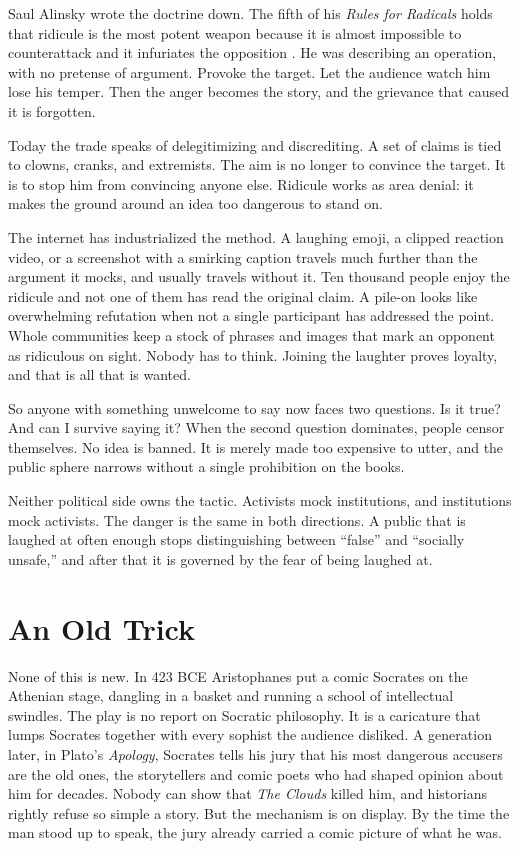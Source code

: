 \documentclass[12pt,a4paper]{book}
\begin{document}
Saul Alinsky wrote the doctrine down. The fifth of his \emph{Rules for Radicals} holds that ridicule is the most potent weapon because it is almost impossible to counterattack and it infuriates the opposition \cite{alinsky1971}. He was describing an operation, with no pretense of argument. Provoke the target. Let the audience watch him lose his temper. Then the anger becomes the story, and the grievance that caused it is forgotten.

Today the trade speaks of delegitimizing and discrediting. A set of claims is tied to clowns, cranks, and extremists. The aim is no longer to convince the target. It is to stop him from convincing anyone else. Ridicule works as area denial: it makes the ground around an idea too dangerous to stand on.

The internet has industrialized the method. A laughing emoji, a clipped reaction video, or a screenshot with a smirking caption travels much further than the argument it mocks, and usually travels without it. Ten thousand people enjoy the ridicule and not one of them has read the original claim. A pile-on looks like overwhelming refutation when not a single participant has addressed the point. Whole communities keep a stock of phrases and images that mark an opponent as ridiculous on sight. Nobody has to think. Joining the laughter proves loyalty, and that is all that is wanted.

So anyone with something unwelcome to say now faces two questions. Is it true? And can I survive saying it? When the second question dominates, people censor themselves. No idea is banned. It is merely made too expensive to utter, and the public sphere narrows without a single prohibition on the books.

Neither political side owns the tactic. Activists mock institutions, and institutions mock activists. The danger is the same in both directions. A public that is laughed at often enough stops distinguishing between ``false'' and ``socially unsafe,'' and after that it is governed by the fear of being laughed at.

\section{An Old Trick}

None of this is new. In 423 BCE Aristophanes put a comic Socrates on the Athenian stage, dangling in a basket and running a school of intellectual swindles. The play is no report on Socratic philosophy. It is a caricature that lumps Socrates together with every sophist the audience disliked. A generation later, in Plato's \emph{Apology}, Socrates tells his jury that his most dangerous accusers are the old ones, the storytellers and comic poets who had shaped opinion about him for decades. Nobody can show that \emph{The Clouds} killed him, and historians rightly refuse so simple a story. But the mechanism is on display. By the time the man stood up to speak, the jury already carried a comic picture of what he was.
\end{document}
